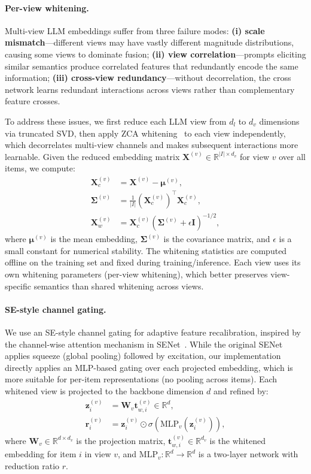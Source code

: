 \documentclass[sigconf,natbib=true,anonymous]{acmart}
\newcommand{\llm}{\textsc{LLM}\xspace}
\begin{document}
\paragraph{Per-view whitening.}
Multi-view \llm embeddings suffer from three failure modes:
\textbf{(i) scale mismatch}---different views may have vastly
different magnitude distributions, causing some views to
dominate fusion; \textbf{(ii) view correlation}---prompts
eliciting similar semantics produce correlated features that
redundantly encode the same information; \textbf{(iii)
cross-view redundancy}---without decorrelation, the cross
network learns redundant interactions across views rather than
complementary feature crosses.

To address these issues, we first reduce each \llm view from $d_l$ to $d_v$
dimensions via truncated SVD, then apply ZCA whitening~\cite{kessy2018zca} to each view
independently, which decorrelates multi-view channels and makes
subsequent interactions more learnable.
Given the reduced embedding matrix $\mathbf{X}^{(v)} \in \mathbb{R}^{|I| \times d_v}$
for view $v$ over all items, we compute:
\begin{align}
  \mathbf{X}_c^{(v)} &= \mathbf{X}^{(v)} - \boldsymbol{\mu}^{(v)}, \\
  \boldsymbol{\Sigma}^{(v)} &= \frac{1}{|I|}(\mathbf{X}_c^{(v)})^\top \mathbf{X}_c^{(v)}, \\
  \mathbf{X}_w^{(v)} &= \mathbf{X}_c^{(v)} (\boldsymbol{\Sigma}^{(v)} + \epsilon \mathbf{I})^{-1/2},
\end{align}
where $\boldsymbol{\mu}^{(v)}$ is the mean embedding, $\boldsymbol{\Sigma}^{(v)}$
is the covariance matrix, and $\epsilon$ is a small constant for numerical
stability. The whitening statistics are computed offline on the training set
and fixed during training/inference. Each view uses its own whitening
parameters (per-view whitening), which better preserves view-specific
semantics than shared whitening across views.

\paragraph{SE-style channel gating.}
We use an SE-style channel gating for adaptive feature
recalibration, inspired by the channel-wise attention mechanism
in SENet~\cite{hu2018senet}. While the original SENet applies
squeeze (global pooling) followed by excitation, our
implementation directly applies an MLP-based gating over each
projected embedding, which is more suitable for per-item
representations (no pooling across items). Each whitened view
is projected to the backbone dimension $d$ and refined by:
\begin{align}
  \mathbf{z}_i^{(v)} &= \mathbf{W}_v \mathbf{t}_{w,i}^{(v)} \in \mathbb{R}^d,\\
  \mathbf{r}_i^{(v)} &= \mathbf{z}_i^{(v)} \odot \sigma(\mathrm{MLP}_v(\mathbf{z}_i^{(v)})),
\end{align}
where $\mathbf{W}_v \in \mathbb{R}^{d \times d_v}$ is the projection matrix,
$\mathbf{t}_{w,i}^{(v)} \in \mathbb{R}^{d_v}$ is the whitened embedding for
item $i$ in view $v$, and $\mathrm{MLP}_v: \mathbb{R}^d \to \mathbb{R}^d$ is a two-layer
network with reduction ratio $r$.
\end{document}
